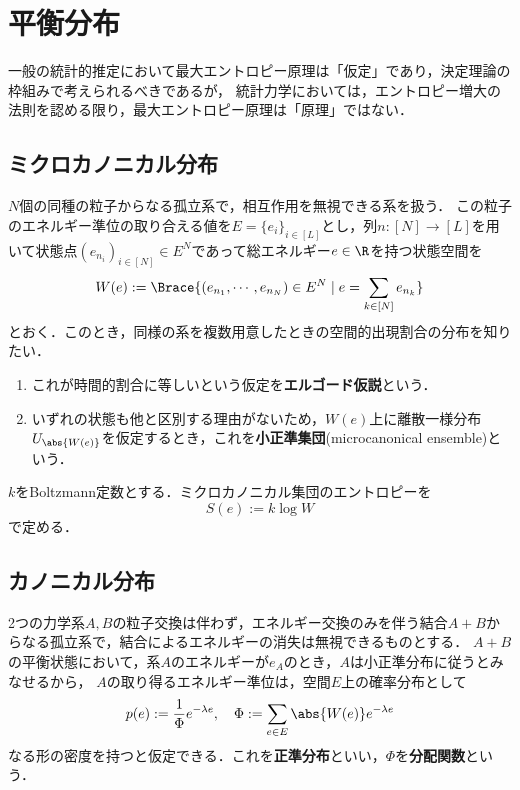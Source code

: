 \documentclass[uplatex,dvipdfmx]{jsreport}
\begin{document}
\section{平衡分布}

\begin{tcolorbox}[colframe=ForestGreen, colback=ForestGreen!10!white,breakable,colbacktitle=ForestGreen!40!white,coltitle=black,fonttitle=\bfseries\sffamily,
title=]
    一般の統計的推定において最大エントロピー原理は「仮定」であり，決定理論の枠組みで考えられるべきであるが，
    統計力学においては，エントロピー増大の法則を認める限り，最大エントロピー原理は「原理」ではない．
\end{tcolorbox}

\subsection{ミクロカノニカル分布}

\begin{model}
    $N$個の同種の粒子からなる孤立系で，相互作用を無視できる系を扱う．
    この粒子のエネルギー準位の取り合える値を$E=\{e_i\}_{i\in[L]}$とし，列$n:[N]\to[L]$を用いて状態点$(e_{n_i})_{i\in[N]}\in E^N$であって総エネルギー$e\in\R$を持つ状態空間を
    \[W(e):=\Brace{(e_{n_1},\cdots,e_{n_N})\in E^N\mid e=\sum_{k\in[N]}e_{n_k}}\]
    とおく．このとき，同様の系を複数用意したときの空間的出現割合の分布を知りたい．
    \begin{enumerate}
        \item これが時間的割合に等しいという仮定を\textbf{エルゴード仮説}という．
        \item いずれの状態も他と区別する理由がないため，$W(e)$上に離散一様分布$U_{\abs{W(e)}}$を仮定するとき，これを\textbf{小正準集団}(microcanonical ensemble)という．
    \end{enumerate}
\end{model}

\begin{definition}
    $k$をBoltzmann定数とする．ミクロカノニカル集団のエントロピーを
    \[S(e):=k\log W\]
    で定める．
\end{definition}

\subsection{カノニカル分布}

\begin{model}
    2つの力学系$A,B$の粒子交換は伴わず，エネルギー交換のみを伴う結合$A+B$からなる孤立系で，結合によるエネルギーの消失は無視できるものとする．
    $A+B$の平衡状態において，系$A$のエネルギーが$e_A$のとき，$A$は小正準分布に従うとみなせるから，
    $A$の取り得るエネルギー準位は，空間$E$上の確率分布として
    \[p(e):=\frac{1}{\Phi}e^{-\lambda e},\quad\Phi:=\sum_{e\in E} \abs{W(e)}e^{-\lambda e}\]
    なる形の密度を持つと仮定できる．これを\textbf{正準分布}といい，$\Phi$を\textbf{分配関数}という．
\end{model}
\end{document}
